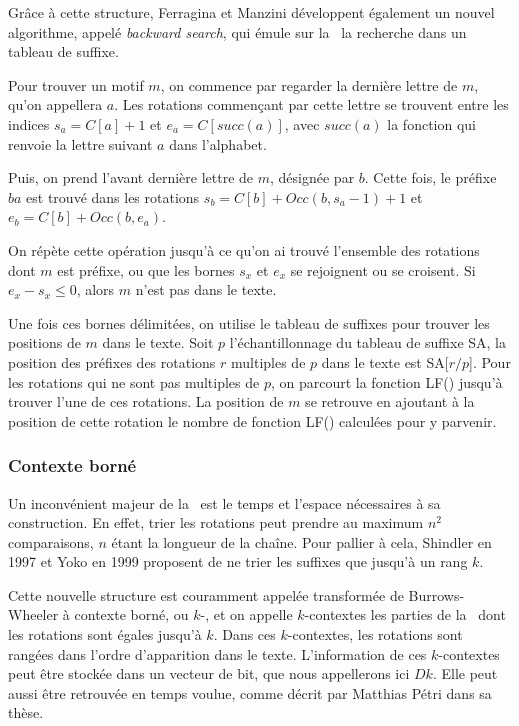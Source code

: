 Grâce à cette structure, Ferragina et Manzini développent également un nouvel algorithme, appelé \textit{backward search}, qui émule sur la \bwt\ la recherche dans un tableau de suffixe.

Pour trouver un motif $m$, on commence par regarder la dernière lettre de $m$, qu'on appellera $a$. Les rotations commençant par cette lettre se trouvent entre les indices $s_a = C[a] + 1$ et $e_a = C[succ(a)]$, avec $succ(a)$ la fonction qui renvoie la lettre suivant $a$ dans l'alphabet. 

Puis, on prend l'avant dernière lettre de $m$, désignée par $b$. Cette fois, le préfixe $ba$ est trouvé dans les rotations $s_b = C[b] + Occ(b, s_a-1) + 1$ et $e_b = C[b] + Occ(b, e_a)$.

On répète cette opération jusqu'à ce qu'on ai trouvé l'ensemble des rotations dont $m$ est préfixe, ou que les bornes $s_x$ et $e_x$ se rejoignent ou se croisent. Si $e_x - s_x \le 0$, alors $m$ n'est pas dans le texte.

Une fois ces bornes délimitées, on utilise le tableau de suffixes pour trouver les positions de $m$ dans le texte. Soit $p$ l'échantillonnage du tableau de suffixe SA, la position des préfixes des rotations $r$ multiples de $p$ dans le texte est SA[$r/p$]. Pour les rotations qui ne sont pas multiples de $p$, on parcourt la fonction LF() jusqu'à trouver l'une de ces rotations. La position de $m$ se retrouve en ajoutant à la position de cette rotation le nombre de fonction LF() calculées pour y parvenir.

\subsubsection{Contexte borné}
Un inconvénient majeur de la \bwt\ est le temps et l'espace nécessaires à sa construction. En effet, trier les rotations peut prendre au maximum $n^{2}$ comparaisons, $n$ étant la longueur de la chaîne.
Pour pallier à cela, Shindler en 1997 et Yoko en 1999 proposent de ne trier les suffixes que jusqu'à un rang $k$. 

Cette nouvelle structure est couramment appelée transformée de Burrows-Wheeler à contexte borné, ou $k$-\bwt, et on appelle $k$-contextes les parties de la \kbwt\ dont les rotations sont égales jusqu'à $k$. Dans ces $k$-contextes, les rotations sont rangées dans l'ordre d'apparition dans le texte. L'information de ces $k$-contextes peut être stockée dans un vecteur de bit, que nous appellerons ici $Dk$. Elle peut aussi être retrouvée en temps voulue, comme décrit par Matthias Pétri dans sa thèse.


